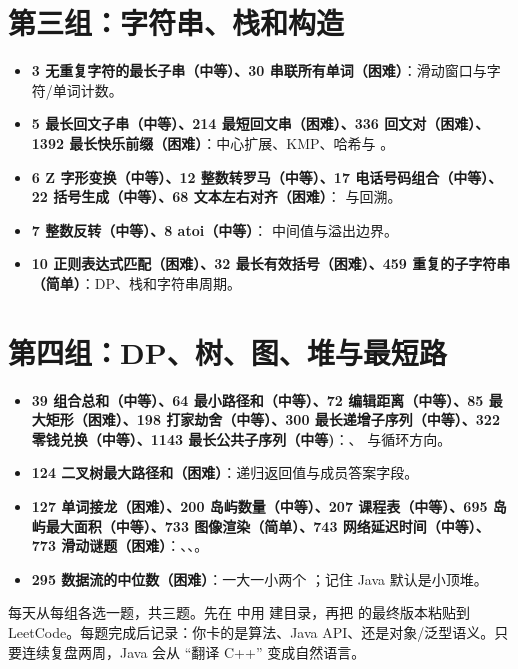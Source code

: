 \section{第三组：字符串、栈和构造}

\begin{itemize}
  \item \textbf{3 无重复字符的最长子串（中等）、30 串联所有单词（困难）}：滑动窗口与字符/单词计数。
  \item \textbf{5 最长回文子串（中等）、214 最短回文串（困难）、336 回文对（困难）、1392 最长快乐前缀（困难）}：中心扩展、KMP、哈希与 。
  \item \textbf{6 Z 字形变换（中等）、12 整数转罗马（中等）、17 电话号码组合（中等）、22 括号生成（中等）、68 文本左右对齐（困难）}： 与回溯。
  \item \textbf{7 整数反转（中等）、8 atoi（中等）}： 中间值与溢出边界。
  \item \textbf{10 正则表达式匹配（困难）、32 最长有效括号（困难）、459 重复的子字符串（简单）}：DP、栈和字符串周期。
\end{itemize}

\section{第四组：DP、树、图、堆与最短路}

\begin{itemize}
  \item \textbf{39 组合总和（中等）、64 最小路径和（中等）、72 编辑距离（中等）、85 最大矩形（困难）、198 打家劫舍（中等）、300 最长递增子序列（中等）、322 零钱兑换（中等）、1143 最长公共子序列（中等)}：、 与循环方向。
  \item \textbf{124 二叉树最大路径和（困难）}：递归返回值与成员答案字段。
  \item \textbf{127 单词接龙（困难）、200 岛屿数量（中等）、207 课程表（中等）、695 岛屿最大面积（中等）、733 图像渲染（简单）、743 网络延迟时间（中等）、773 滑动谜题（困难）}：、、。
  \item \textbf{295 数据流的中位数（困难）}：一大一小两个 ；记住 Java 默认是小顶堆。
\end{itemize}

\begin{transfer}[推荐执行法]
每天从每组各选一题，共三题。先在  中用  建目录，再把  的最终版本粘贴到 LeetCode。每题完成后记录：你卡的是算法、Java API、还是对象/泛型语义。只要连续复盘两周，Java 会从 ``翻译 C++'' 变成自然语言。
\end{transfer}
